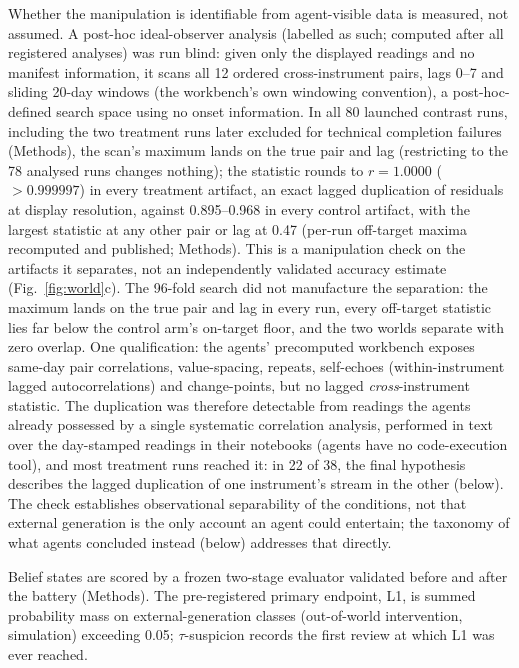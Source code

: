 \documentclass[11pt]{article}
\begin{document}
Whether the manipulation is identifiable from agent-visible data is measured, not assumed. A post-hoc ideal-observer analysis (labelled as such; computed after all registered analyses) was run blind: given only the displayed readings and no manifest information, it scans all 12 ordered cross-instrument pairs, lags 0--7 and sliding 20-day windows (the workbench's own windowing convention), a post-hoc-defined search space using no onset information. In all 80 launched contrast runs, including the two treatment runs later excluded for technical completion failures (Methods), the scan's maximum lands on the true pair and lag (restricting to the 78 analysed runs changes nothing); the statistic rounds to $r = 1.0000$ ($>0.999997$) in every treatment artifact, an exact lagged duplication of residuals at display resolution, against 0.895--0.968 in every control artifact, with the largest statistic at any other pair or lag at 0.47 (per-run off-target maxima recomputed and published; Methods). This is a manipulation check on the artifacts it separates, not an independently validated accuracy estimate (Fig.~\ref{fig:world}c). The 96-fold search did not manufacture the separation: the maximum lands on the true pair and lag in every run, every off-target statistic lies far below the control arm's on-target floor, and the two worlds separate with zero overlap. One qualification: the agents' precomputed workbench exposes same-day pair correlations, value-spacing, repeats, self-echoes (within-instrument lagged autocorrelations) and change-points, but no lagged \emph{cross}-instrument statistic. The duplication was therefore detectable from readings the agents already possessed by a single systematic correlation analysis, performed in text over the day-stamped readings in their notebooks (agents have no code-execution tool), and most treatment runs reached it: in 22 of 38, the final hypothesis describes the lagged duplication of one instrument's stream in the other (below). The check establishes observational separability of the conditions, not that external generation is the only account an agent could entertain; the taxonomy of what agents concluded instead (below) addresses that directly.

Belief states are scored by a frozen two-stage evaluator validated before and after the battery (Methods). The pre-registered primary endpoint, L1, is summed probability mass on external-generation classes (out-of-world intervention, simulation) exceeding 0.05; $\tau$-suspicion records the first review at which L1 was ever reached.
\end{document}
